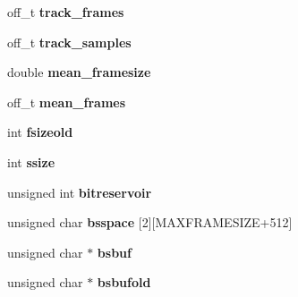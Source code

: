\begin{DoxyCompactItemize}
\begin{tabbing}
\end{tabbing}\item 
\mbox{\label{structmpg123__handle__struct_a54cd8976bf74c2f8f8120b33a3d1da41}} 
off\+\_\+t {\bfseries track\+\_\+frames}
\item 
\mbox{\label{structmpg123__handle__struct_a936264eeeac49863dfa1ef89d5a4dee6}} 
off\+\_\+t {\bfseries track\+\_\+samples}
\item 
\mbox{\label{structmpg123__handle__struct_a7cc1a102d8b013926372e0008abb3794}} 
double {\bfseries mean\+\_\+framesize}
\item 
\mbox{\label{structmpg123__handle__struct_a27c2f805e17244e526c267b4921e9988}} 
off\+\_\+t {\bfseries mean\+\_\+frames}
\item 
\mbox{\label{structmpg123__handle__struct_aae74f88d89738e269d9b8a0c0a588211}} 
int {\bfseries fsizeold}
\item 
\mbox{\label{structmpg123__handle__struct_abc4bd9bedc4635c3f0b33cbc5ce54b87}} 
int {\bfseries ssize}
\item 
\mbox{\label{structmpg123__handle__struct_a7b9fb7254fb1ff64e15c13c6e4a2c0ce}} 
unsigned int {\bfseries bitreservoir}
\item 
\mbox{\label{structmpg123__handle__struct_a3b141583e1324f64ad29bbf6bd172c9c}} 
unsigned char {\bfseries bsspace} \mbox{[}2\mbox{]}\mbox{[}M\+A\+X\+F\+R\+A\+M\+E\+S\+I\+ZE+512\mbox{]}
\item 
\mbox{\label{structmpg123__handle__struct_aac26ec9df89a51f9d17cb5b4c925133a}} 
unsigned char $\ast$ {\bfseries bsbuf}
\item 
\mbox{\label{structmpg123__handle__struct_a39bff9db9435957c9c1a1344c45e3714}} 
unsigned char $\ast$ {\bfseries bsbufold}
\item 
\mbox{\label{structmpg123__handle__struct_acbb9326c14e1b9815826000a7bbc7ca7}} 

\end{DoxyCompactItemize}
